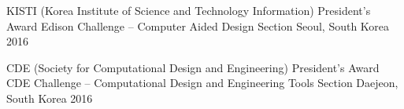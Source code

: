 

\begin{cvhonors}


\cvhonor
{KISTI (Korea Institute of Science and Technology Information) President’s Award} %
{Edison Challenge –  Computer Aided Design Section} %
{Seoul, South Korea} %
{2016} %


\cvhonor
{CDE (Society for Computational Design and Engineering) President’s Award} %
{CDE Challenge – Computational Design and Engineering Tools Section} %
{Daejeon, South Korea} %
{2016} %


\end{cvhonors}